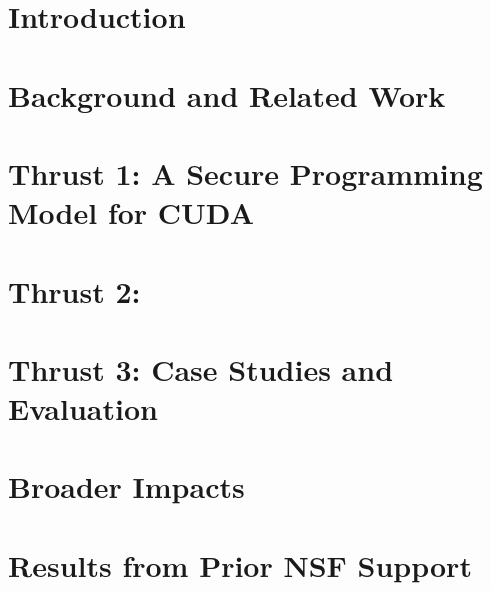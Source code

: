 \documentclass[11pt]{article}
\newif\ifsplit
\begin{document}






 




\section{Introduction}


\section{Background and Related Work}


\section{Thrust 1: A Secure Programming Model for CUDA}


\section{Thrust 2: }


\section{Thrust 3: Case Studies and Evaluation}


\section{Broader Impacts}


\section{Results from Prior NSF Support}


\ifsplit
\else
\FloatBarrier
\newpage



\fi
\end{document}
